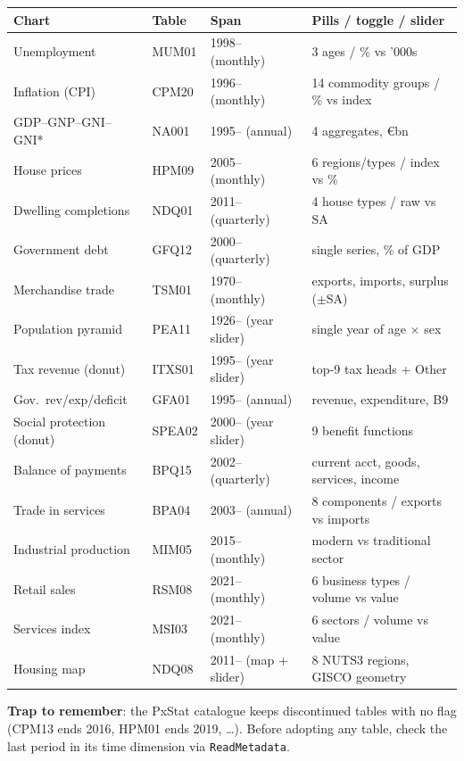 \documentclass[11pt,a4paper]{article}
\begin{document}
\begin{center}\small
\begin{tabular}{@{}llll@{}}
\toprule
\textbf{Chart} & \textbf{Table} & \textbf{Span} & \textbf{Pills / toggle / slider}\\
\midrule
Unemployment          & MUM01 & 1998-- (monthly) & 3 ages / \% vs '000s\\
Inflation (CPI)       & CPM20 & 1996-- (monthly) & 14 commodity groups / \% vs index\\
GDP--GNP--GNI--GNI*   & NA001 & 1995-- (annual)  & 4 aggregates, \euro{}bn\\
House prices          & HPM09 & 2005-- (monthly) & 6 regions/types / index vs \%\\
Dwelling completions  & NDQ01 & 2011-- (quarterly) & 4 house types / raw vs SA\\
Government debt       & GFQ12 & 2000-- (quarterly) & single series, \% of GDP\\
Merchandise trade     & TSM01 & 1970-- (monthly) & exports, imports, surplus ($\pm$SA)\\
Population pyramid    & PEA11 & 1926-- (year slider) & single year of age $\times$ sex\\
\addlinespace
Tax revenue (donut)   & ITXS01 & 1995-- (year slider) & top-9 tax heads + Other\\
Gov.\ rev/exp/deficit & GFA01 & 1995-- (annual) & revenue, expenditure, B9\\
Social protection (donut) & SPEA02 & 2000-- (year slider) & 9 benefit functions\\
Balance of payments   & BPQ15 & 2002-- (quarterly) & current acct, goods, services, income\\
Trade in services     & BPA04 & 2003-- (annual) & 8 components / exports vs imports\\
Industrial production & MIM05 & 2015-- (monthly) & modern vs traditional sector\\
Retail sales          & RSM08 & 2021-- (monthly) & 6 business types / volume vs value\\
Services index        & MSI03 & 2021-- (monthly) & 6 sectors / volume vs value\\
Housing map           & NDQ08 & 2011-- (map + slider) & 8 NUTS3 regions, GISCO geometry\\
\bottomrule
\end{tabular}
\end{center}

\textbf{Trap to remember}: the PxStat catalogue keeps discontinued tables with
no flag (CPM13 ends 2016, HPM01 ends 2019, \dots). Before adopting any table,
check the last period in its time dimension via \texttt{ReadMetadata}.
\end{document}
